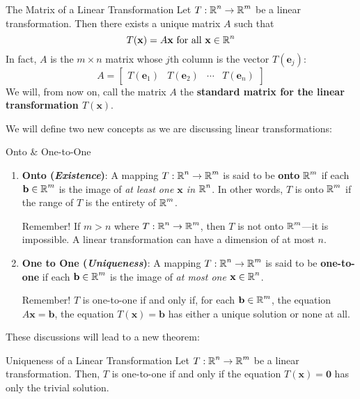 \documentclass{article}
\begin{document}
\begin{theorem}{The Matrix of a Linear Transformation}
	Let $T: \operatorname{\mathbb{R}}^n \to \operatorname{\mathbb{R}}^m$ be a linear transformation. Then there exists a unique matrix $A$ such that
	$$
		T(\mathbf{x}) = A\mathbf{x} \text{ for all } \mathbf{x} \in \operatorname{\mathbb{R}}^n
	$$
	In fact, $A$ is the $m \times n$ matrix whose $j$th column is the vector $T(\mathbf{e}_j)$:
	$$
		A = \begin{bmatrix} T(\mathbf{e}_1) & T(\mathbf{e}_2) & \cdots & T(\mathbf{e}_n) \end{bmatrix}
	$$
	We will, from now on, call the matrix $A$ the \textbf{standard matrix for the linear transformation $T(\mathbf{x})$}.

\end{theorem}

We will define two new concepts as we are discussing linear transformations:
\begin{definition}{Onto \& One-to-One}
	\begin{enumerate}
		\item
		      \textbf{Onto (\emph{Existence})}: A mapping $T: \operatorname{\mathbb{R}}^n \to \operatorname{\mathbb{R}}^m$ is said to be \textbf{onto} $\operatorname{\mathbb{R}}^m$ if each $\mathbf{b} \in \operatorname{\mathbb{R}}^m$ is the image of \emph{at least one $\mathbf{x}$ in $\operatorname{\mathbb{R}}^n$}. In other words, $T$ is onto $\operatorname{\mathbb{R}}^m$ if the range of $T$ is the entirety of $\operatorname{\mathbb{R}}^m$.
		      \begin{warn}{Remember!}
			      If $m > n$ where $T: \operatorname{\mathbb{R}}^n \to \operatorname{\mathbb{R}}^m$, then $T$ is not onto $\operatorname{\mathbb{R}}^m$---it is impossible. A linear transformation can have a dimension of at most $n$.
		      \end{warn}
		\item
		      \textbf{One to One (\emph{Uniqueness})}: A mapping $T: \operatorname{\mathbb{R}}^n \to \operatorname{\mathbb{R}}^m$ is said to be \textbf{one-to-one} if each $\mathbf{b} \in \operatorname{\mathbb{R}}^m$ is the image of \emph{at most one $\mathbf{x} \in \operatorname{\mathbb{R}}^n$}.

		      \begin{warn}{Remember!}
			      $T$ is one-to-one if and only if, for each $\mathbf{b} \in \operatorname{\mathbb{R}}^m$, the equation $A\mathbf{x} = \mathbf{b}$, the equation $T(\mathbf{x}) = \mathbf{b}$ has either a unique solution or none at all.
		      \end{warn}
	\end{enumerate}
\end{definition}
These discussions will lead to a new theorem:

\begin{theorem}{Uniqueness of a Linear Transformation}
	Let $T: \operatorname{\mathbb{R}}^n \to \operatorname{\mathbb{R}}^m$ be a linear transformation. Then, $T$ is one-to-one if and only if the equation $T(\mathbf{x}) = \mathbf{0}$ has only the trivial solution.
\end{theorem}
\end{document}
